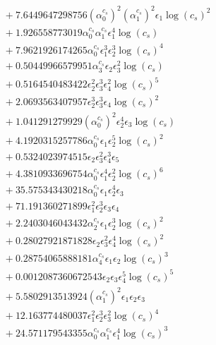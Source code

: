 \documentclass[10pt]{article}
\begin{document}
\begin{align*}
&{}  + 7.6449647298756 \left(\alpha_{0}^{c_s}\right)^{2} \left(\alpha_{1}^{c_s}\right)^{2} \epsilon_{1} \log{\left(c_{s} \right)}^{2} \\
&{}  + 1.926558773019 \alpha_{0}^{c_s} \alpha_{1}^{c_s} \epsilon_{1}^{4} \log{\left(c_{s} \right)} \\
&{}  + 7.9621926174265 \alpha_{0}^{c_s} \epsilon_{1}^{3} \epsilon_{2}^{3} \log{\left(c_{s} \right)}^{4} \\
&{}  + 0.50449966579951 \alpha_{3}^{c_s} \epsilon_{2} \epsilon_{3}^{2} \log{\left(c_{s} \right)} \\
&{}  + 0.5164540483422 \epsilon_{2}^{2} \epsilon_{3}^{3} \epsilon_{4}^{2} \log{\left(c_{s} \right)}^{5} \\
&{}  + 2.0693563407957 \epsilon_{2}^{3} \epsilon_{3}^{3} \epsilon_{4} \log{\left(c_{s} \right)}^{2} \\
&{}  + 1.041291279929 \left(\alpha_{0}^{c_s}\right)^{2} \epsilon_{2}^{4} \epsilon_{3} \log{\left(c_{s} \right)} \\
&{}  + 4.1920315257786 \alpha_{0}^{c_s} \epsilon_{1} \epsilon_{2}^{5} \log{\left(c_{s} \right)}^{2} \\
&{}  + 0.5324023974515 \epsilon_{2} \epsilon_{3}^{2} \epsilon_{4}^{3} \epsilon_{5} \\
&{}  + 4.3810933696754 \alpha_{0}^{c_s} \epsilon_{1}^{4} \epsilon_{2}^{2} \log{\left(c_{s} \right)}^{6} \\
&{}  + 35.575343430218 \alpha_{0}^{c_s} \epsilon_{1} \epsilon_{2}^{4} \epsilon_{3} \\
&{}  + 71.191360271899 \epsilon_{1}^{2} \epsilon_{2}^{3} \epsilon_{3} \epsilon_{4} \\
&{}  + 2.2403046043432 \alpha_{2}^{c_s} \epsilon_{1} \epsilon_{2}^{3} \log{\left(c_{s} \right)}^{2} \\
&{}  + 0.28027921871828 \epsilon_{2} \epsilon_{3}^{2} \epsilon_{4}^{4} \log{\left(c_{s} \right)}^{2} \\
&{}  + 0.28754065888181 \alpha_{4}^{c_s} \epsilon_{1} \epsilon_{2} \log{\left(c_{s} \right)}^{3} \\
&{}  + 0.0012087360672543 \epsilon_{2} \epsilon_{3} \epsilon_{4}^{5} \log{\left(c_{s} \right)}^{5} \\
&{}  + 5.5802913513924 \left(\alpha_{1}^{c_s}\right)^{2} \epsilon_{1} \epsilon_{2} \epsilon_{3} \\
&{}  + 12.163774480037 \epsilon_{1}^{2} \epsilon_{2}^{3} \epsilon_{3}^{2} \log{\left(c_{s} \right)}^{4} \\
&{}  + 24.571179543355 \alpha_{0}^{c_s} \alpha_{1}^{c_s} \epsilon_{1}^{4} \log{\left(c_{s} \right)}^{3} \\

\end{align*}
\end{document}
